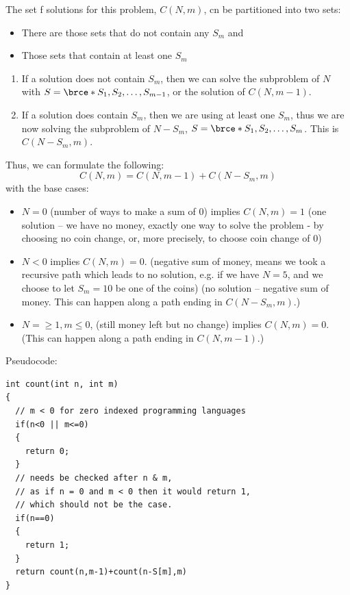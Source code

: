 The set f solutions for this problem, $C(N,m)$, cn be partitioned into two
sets:
\begin{itemize}%
\item There are those sets that do not contain any $S_m$ and
\item Those sets that contain at least one $S_m$
\end{itemize}
\begin{enumerate}[label=\textbf{\alph*.}]
\item If a solution does not contain $S_m$, then we can solve the subproblem
  of $N$ with $S=\brce*{S_1,S_2,\ldots,S_{m-1}}$, or the solution of
  $C(N,m-1)$.
\item If a solution does contain $S_m$, then we are using at least one
  $S_m$, thus we are now solving the subproblem of $N-S_m$,
  $S=\brce*{S_1,S_2,\ldots,S_m}$. This is $C(N-S_m, m)$.
\end{enumerate}
 Thus, we can formulate the
following:
\begin{equation*}
C(N,m) = C(N,m-1)+C(N-S_m,m)
\end{equation*}
with the base cases:
\begin{itemize}%
\item $N=0$ (number of ways to make a sum of 0) implies $C(N,m) = 1$ (one
  solution -- we have no money, exactly one way to solve the problem - by
  choosing no coin change, or, more precisely, to choose coin change of $0$)
\item $N<0$ implies $C(N,m)=0$. (negative sum of money, means we took a
  recursive path which leads to no solution, e.g. if we have $N=5$, and we
  choose to let $S_m=10$ be one of the coins) (no solution -- negative sum
  of money. This can happen along a path ending in $C(N-S_m,m)$.)
\item $N=\geq 1, m\leq 0$, (still money left but no change) implies $C(N,m)
  = 0$. (This can happen along a path ending in $C(N,m-1)$.) 
\end{itemize}

Pseudocode:
\begin{lstlisting}[style=pseudostyle]
int count(int n, int m)
{
  // m < 0 for zero indexed programming languages
  if(n<0 || m<=0)
  {
    return 0;
  }
  // needs be checked after n & m, 
  // as if n = 0 and m < 0 then it would return 1, 
  // which should not be the case.
  if(n==0)
  {
    return 1;
  }
  return count(n,m-1)+count(n-S[m],m)
}
\end{lstlisting}


